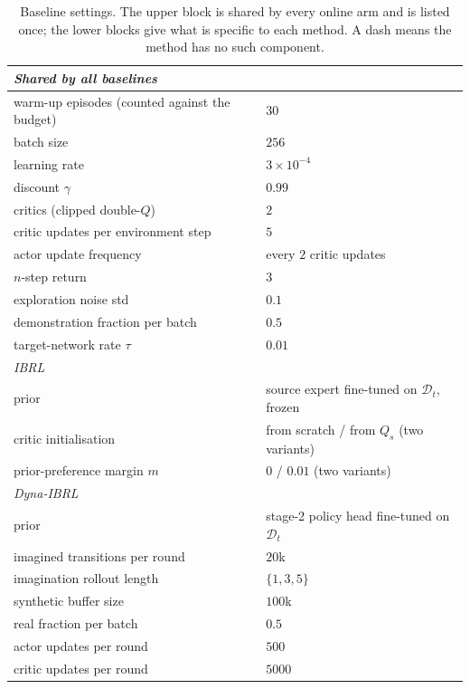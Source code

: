 \documentclass{article} %
\begin{document}
\begin{table}[h]
\centering
\caption{Baseline settings. The upper block is shared by every online arm and is
listed once; the lower blocks give what is specific to each method. A dash means
the method has no such component.}
\label{tab:app-baselines}
\small
\begin{tabular}{ll}
\toprule
\multicolumn{2}{l}{\emph{Shared by all baselines}} \\
\midrule
warm-up episodes (counted against the budget) & $30$ \\
batch size                        & $256$ \\
learning rate                     & $3{\times}10^{-4}$ \\
discount $\gamma$                 & $0.99$ \\
critics (clipped double-$Q$)      & $2$ \\
critic updates per environment step & $5$ \\
actor update frequency            & every $2$ critic updates \\
$n$-step return                   & $3$ \\
exploration noise std             & $0.1$ \\
demonstration fraction per batch  & $0.5$ \\
target-network rate $\tau$        & $0.01$ \\
\midrule
\multicolumn{2}{l}{\emph{IBRL}} \\
\midrule
prior                             & source expert fine-tuned on $\mathcal{D}_t$, frozen \\
critic initialisation             & from scratch / from $Q_s$ (two variants) \\
prior-preference margin $m$       & $0$ / $0.01$ (two variants) \\
\midrule
\multicolumn{2}{l}{\emph{Dyna-IBRL}} \\
\midrule
prior                             & stage-2 policy head fine-tuned on $\mathcal{D}_t$ \\
imagined transitions per round    & $20$k \\
imagination rollout length        & $\{1,3,5\}$ \\
synthetic buffer size             & $100$k \\
real fraction per batch           & $0.5$ \\
actor updates per round           & $500$ \\
critic updates per round          & $5000$ \\

\end{tabular}
\end{table}
\end{document}
